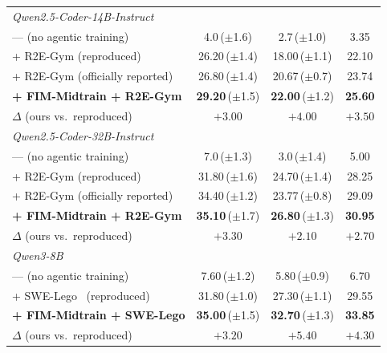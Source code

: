 \begin{table}[t]
\begin{tabular}{lccc}
\midrule
\multicolumn{4}{l}{\textit{Qwen2.5-Coder-14B-Instruct}} \\
\quad --- (no agentic training)                       & 4.0\,($\pm$1.6)            & 2.7\,($\pm$1.0)            & 3.35 \\
\quad + R2E-Gym (reproduced)                          & 26.20\,($\pm$1.4)          & 18.00\,($\pm$1.1)          & 22.10 \\
\quad + R2E-Gym (officially reported)                 & 26.80\,($\pm$1.4)          & 20.67\,($\pm$0.7)          & 23.74 \\
\quad \textbf{+ FIM-Midtrain + R2E-Gym}               & \textbf{29.20}\,($\pm$1.5) & \textbf{22.00}\,($\pm$1.2) & \textbf{25.60} \\
\rowcolor{blue!8}
\quad\quad $\Delta$ (ours vs.\ reproduced)            & $+3.00$                    & $+4.00$                    & $+3.50$ \\
\midrule
\multicolumn{4}{l}{\textit{Qwen2.5-Coder-32B-Instruct}} \\
\quad --- (no agentic training)                       & 7.0\,($\pm$1.3)            & 3.0\,($\pm$1.4)            & 5.00 \\
\quad + R2E-Gym (reproduced)                          & 31.80\,($\pm$1.6)          & 24.70\,($\pm$1.4)          & 28.25 \\
\quad + R2E-Gym (officially reported)                 & 34.40\,($\pm$1.2)          & 23.77\,($\pm$0.8)          & 29.09 \\
\quad \textbf{+ FIM-Midtrain + R2E-Gym}               & \textbf{35.10}\,($\pm$1.7) & \textbf{26.80}\,($\pm$1.3) & \textbf{30.95} \\
\rowcolor{blue!8}
\quad\quad $\Delta$ (ours vs.\ reproduced)            & $+3.30$                    & $+2.10$                    & $+2.70$ \\
\midrule
\multicolumn{4}{l}{\textit{Qwen3-8B}} \\
\quad --- (no agentic training)                       & 7.60\,($\pm$1.2)           & 5.80\,($\pm$0.9)           & 6.70 \\
\quad + SWE-Lego~\citep{swelego} (reproduced)         & 31.80\,($\pm$1.0)          & 27.30\,($\pm$1.1)          & 29.55 \\
\quad \textbf{+ FIM-Midtrain + SWE-Lego}              & \textbf{35.00}\,($\pm$1.5) & \textbf{32.70}\,($\pm$1.3) & \textbf{33.85} \\
\rowcolor{blue!8}
\quad\quad $\Delta$ (ours vs.\ reproduced)            & $+3.20$                    & $+5.40$                    & $+4.30$ \\
\bottomrule
\end{tabular}
\end{table}


